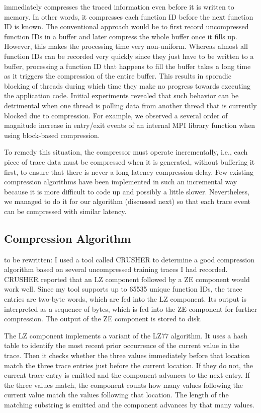\parlot immediately compresses the traced information even before it is written to memory. In other words, it compresses each function ID before the next function ID is known. The conventional approach would be to first record uncompressed function IDs in a buffer and later compress the whole buffer once it fills up. However, this makes the processing time very non-uniform. Whereas almost all function IDs can be recorded very quickly since they just have to be written to a buffer, processing a function ID that happens to fill the buffer takes a long time as it triggers the compression of the entire buffer. This results in sporadic blocking of threads during which time they make no progress towards executing the application code. Initial experiments revealed that such behavior can be detrimental when one thread is polling data from another thread that is currently blocked due to compression. For example, we observed a several order of magnitude increase in entry/exit events of an internal MPI library function when using block-based compression.

To remedy this situation, the compressor must operate incrementally, i.e., each piece of trace data must be compressed when it is generated, without buffering it first, to ensure that there is never a long-latency compression delay. Few existing compression algorithms have been implemented in such an incremental way because it is more difficult to code up and possibly a little slower. Nevertheless, we managed to do it for our algorithm (discussed next) so that each trace event can be compressed with similar latency.

\subsection{Compression Algorithm}

to be rewritten: I used a tool called CRUSHER to determine a good compression algorithm based on several uncompressed training traces I had recorded. CRUSHER reported that an LZ component followed by a ZE component would work well. Since my tool supports up to 65535 unique function IDs, the trace entries are two-byte words, which are fed into the LZ component. Its output is interpreted as a sequence of bytes, which is fed into the ZE component for further compression. The output of the ZE component is stored to disk.

The LZ component implements a variant of the LZ77 algorithm. It uses a hash table to identify the most recent prior occurrence of the current value in the trace. Then it checks whether the three values immediately before that location match the three trace entries just before the current location. If they do not, the current trace entry is emitted and the component advances to the next entry. If the three values match, the component counts how many values following the current value match the values following that location. The length of the matching substring is emitted and the component advances by that many values.

